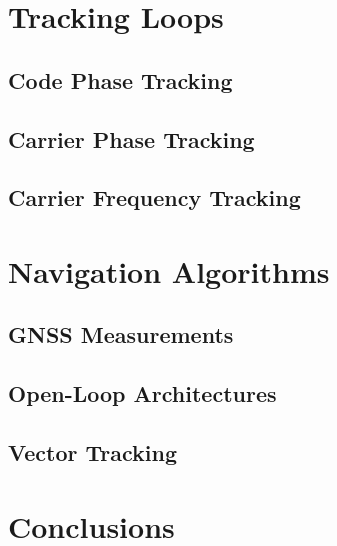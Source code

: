\section{Tracking Loops}
\subsection{Code Phase Tracking}
\subsection{Carrier Phase Tracking}
\subsection{Carrier Frequency Tracking}

\section{Navigation Algorithms}
\subsection{GNSS Measurements}
\subsection{Open-Loop Architectures}
\subsection{Vector Tracking}

\section{Conclusions}